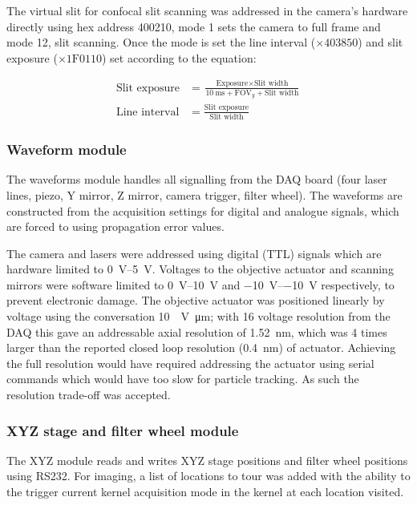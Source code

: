 The virtual slit for confocal slit scanning was addressed in the camera's hardware directly using hex address 400210, mode 1 sets the camera to full frame and mode 12, slit scanning.
Once the mode is set the line interval ($\times 403850$) and slit exposure ($\times \text{1F0110}$) set according to the equation:

\begin{align}
    \text{Slit exposure} &= \frac{\text{Exposure} \times \text{Slit width}}{\SI{10}{\milli\second} + \text{FOV}_y + \text{Slit width}}\\
    \text{Line interval} &= \frac{\text{Slit exposure}}{\text{Slit width}}
\end{align}

\subsubsection{Waveform module}

The waveforms module handles all signalling from the DAQ board (four laser lines, piezo, Y mirror, Z mirror, camera trigger, filter wheel).
The waveforms are constructed from the acquisition settings for digital and analogue signals, which are forced to using propagation error values.

The camera and lasers were addressed using digital (TTL) signals which are hardware limited to \SIrange{0}{5}{\volt}.
Voltages to the objective actuator and scanning mirrors were software limited to \SIrange{0}{10}{\volt} and \SIrange{-10}{-10}{\volt} respectively, to prevent electronic damage.
The objective actuator was positioned linearly by voltage using the conversation \SI{10}{\per\volt\micro\meter}; with \SI{16}{\bit} voltage resolution from the DAQ this gave an addressable axial resolution of \SI{1.52}{\nano\meter}, which was 4 times larger than the reported closed loop resolution (\SI{0.4}{\nano\meter}) of actuator.
Achieving the full resolution would have required addressing the actuator using serial commands which would have too slow for particle tracking.
As such the resolution trade-off was accepted.



\subsubsection{XYZ stage and filter wheel module}

The XYZ module reads and writes XYZ stage positions and filter wheel positions using RS232.
For imaging, a list of locations to tour was added with the ability to the trigger current kernel acquisition mode in the kernel at each location visited.

